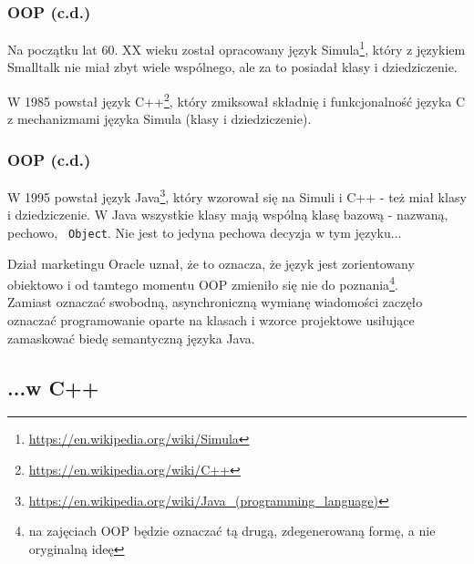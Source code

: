 \documentclass[aspectratio=169,10pt]{beamer}
\begin{document}
\begin{frame}
    \frametitle{OOP (c.d.)}

    Na początku lat 60. XX wieku został opracowany język
    Simula\footnote{\url{https://en.wikipedia.org/wiki/Simula}}, który z językiem
    Smalltalk nie miał zbyt wiele wspólnego, ale za to posiadał klasy i
    dziedziczenie.

    \vspace{1em}

    W 1985 powstał język C++\footnote{\url{https://en.wikipedia.org/wiki/C++}},
    który zmiksował składnię i funkcjonalność języka C z mechanizmami języka
    Simula (klasy i dziedziczenie).
\end{frame}

\begin{frame}
    \frametitle{OOP (c.d.)}

    W 1995 powstał język
    Java\footnote{\url{https://en.wikipedia.org/wiki/Java_(programming_language)}},
    który wzorował się na Simuli i C++ - też miał klasy i dziedziczenie.
    W Java wszystkie klasy mają wspólną klasę bazową - nazwaną, pechowo, {\tt
    Object}. Nie jest to jedyna pechowa decyzja w tym języku...

    \vspace{1em}

    Dział marketingu Oracle uznał, że to oznacza, że język jest zorientowany
    obiektowo i od tamtego momentu OOP zmieniło się nie do poznania\footnote{na
    zajęciach OOP będzie oznaczać tą drugą, zdegenerowaną formę, a nie
    oryginalną ideę}.\\Zamiast oznaczać swobodną, asynchroniczną wymianę
    wiadomości zaczęło oznaczać programowanie oparte na klasach i wzorce
    projektowe usiłujące zamaskować biedę semantyczną języka Java.
\end{frame}

\subsection{...w C++}
\end{document}
